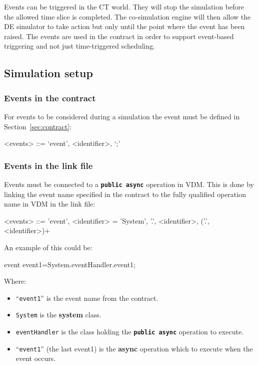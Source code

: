 \documentclass{crescendorepchap}
\newcommand{\vdmkeyw}[1]{{\bf\ttfamily #1}}
\begin{document}
Events can be triggered in the CT world. They will stop the simulation
before the allowed time slice is completed. The co-simulation engine
will then allow the DE simulator to take action but only until the point
where the event has been raised. The events are used in the contract in
order to support event-based triggering and not just time-triggered
scheduling.

\subsection{Simulation setup}

\subsubsection{Events in the contract}

For events to be considered during a simulation the event must be
defined in Section~\ref{sec:contract}:

\begin{grammar}
<events> ::= `event', <identifier>, `;'
\end{grammar}

\subsubsection{Events in the link file}

Events must be connected to a \texttt{\textbf{public async}} operation in VDM. This is
done by linking the event name specified in the contract to the fully
qualified operation name in VDM in the link file:

\begin{grammar}
<events> ::= 'event', <identifier> = 'System', '.', <identifier>, ('.', <identifier>)+
\end{grammar}

An example of this could be:

\begin{dcl}
event event1=System.eventHandler.event1;
\end{dcl}

Where:

\begin{itemize}
\item
  ``\texttt{event1}'' is the event name from the contract.
\item
  \texttt{System} is the \vdmkeyw{system} class.
\item
  \texttt{eventHandler} is the class holding the \texttt{\textbf{public async}} operation to execute.
\item
  ``\texttt{event1}'' (the last event1) is the \vdmkeyw{async} operation which to execute
  when the event occurs.
\end{itemize}
\end{document}
